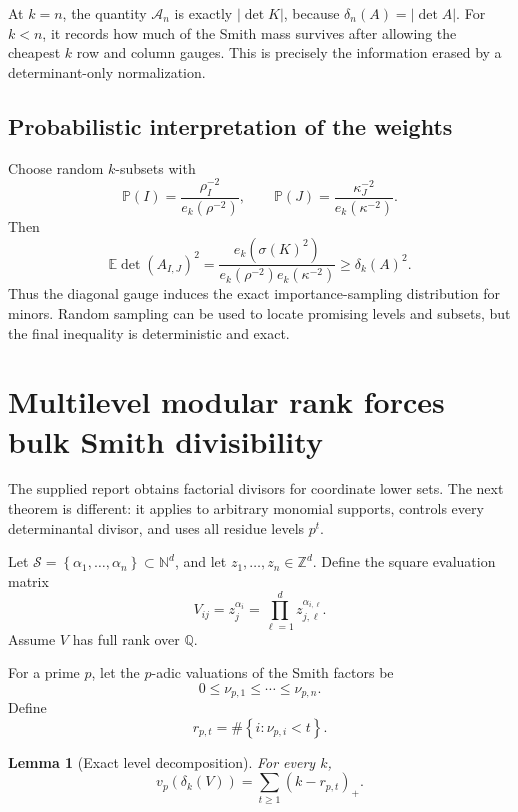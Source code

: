 \documentclass[11pt,oneside]{article}
\newtheorem{lemma}[theorem]{Lemma}
\theoremstyle{definition}
\theoremstyle{remark}
\newcommand{\Q}{\mathbb{Q}}
\newcommand{\Z}{\mathbb{Z}}
\newcommand{\N}{\mathbb{N}}
\newcommand{\Prob}{\mathbb{P}}
\newcommand{\E}{\mathbb{E}}
\newcommand{\abs}[1]{\left\lvert #1\right\rvert}
\newcommand{\set}[1]{\left\{#1\right\}}
\begin{document}
At $k=n$, the quantity $\mathcal A_n$ is exactly $\abs{\det K}$, because $\delta_n(A)=\abs{\det A}$.  For $k<n$, it records how much of the Smith mass survives after allowing the cheapest $k$ row and column gauges.  This is precisely the information erased by a determinant-only normalization.

\subsection{Probabilistic interpretation of the weights}

Choose random $k$-subsets with
\[
 \Prob(I)=\frac{\rho_I^{-2}}{e_k(\rho^{-2})},
 \qquad
 \Prob(J)=\frac{\kappa_J^{-2}}{e_k(\kappa^{-2})}.
\]
Then
\begin{equation}
 \E\det(A_{I,J})^2
 =\frac{e_k(\sigma(K)^2)}{e_k(\rho^{-2})e_k(\kappa^{-2})}
 \ge\delta_k(A)^2.
 \label{eq:weighted-random-minor}
\end{equation}
Thus the diagonal gauge induces the exact importance-sampling distribution for minors.  Random sampling can be used to locate promising levels and subsets, but the final inequality is deterministic and exact.

\section{Multilevel modular rank forces bulk Smith divisibility}
\label{sec:modular}

The supplied report obtains factorial divisors for coordinate lower sets.  The next theorem is different: it applies to arbitrary monomial supports, controls every determinantal divisor, and uses all residue levels $p^t$.

Let $\mathcal S=\set{\alpha_1,\dots,\alpha_n}\subset\N^d$, and let
$z_1,\dots,z_n\in\Z^d$.  Define the square evaluation matrix
\begin{equation}
 V_{ij}=z_j^{\alpha_i}
 =\prod_{\ell=1}^d z_{j,\ell}^{\alpha_{i,\ell}}.
 \label{eq:multivar-eval}
\end{equation}
Assume $V$ has full rank over $\Q$.

For a prime $p$, let the $p$-adic valuations of the Smith factors be
\[
 0\le\nu_{p,1}\le\cdots\le\nu_{p,n}.
\]
Define
\begin{equation}
 r_{p,t}=\#\set{i:\nu_{p,i}<t}.
 \label{eq:smith-rank-level}
\end{equation}

\begin{lemma}[Exact level decomposition]
\label{lem:level-decomp}
For every $k$,
\begin{equation}
 v_p(\delta_k(V))
 =\sum_{t\ge1}(k-r_{p,t})_+.
 \label{eq:level-decomp}
\end{equation}
\end{lemma}
\end{document}
